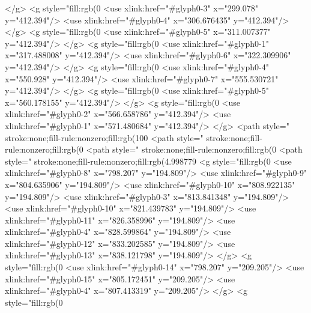 </g>
<g style="fill:rgb(0%
  <use xlink:href="#glyph0-3" x="299.078" y="412.394"/>
  <use xlink:href="#glyph0-4" x="306.676435" y="412.394"/>
</g>
<g style="fill:rgb(0%
  <use xlink:href="#glyph0-5" x="311.007377" y="412.394"/>
</g>
<g style="fill:rgb(0%
  <use xlink:href="#glyph0-1" x="317.488008" y="412.394"/>
  <use xlink:href="#glyph0-6" x="322.309906" y="412.394"/>
</g>
<g style="fill:rgb(0%
  <use xlink:href="#glyph0-4" x="550.928" y="412.394"/>
  <use xlink:href="#glyph0-7" x="555.530721" y="412.394"/>
</g>
<g style="fill:rgb(0%
  <use xlink:href="#glyph0-5" x="560.178155" y="412.394"/>
</g>
<g style="fill:rgb(0%
  <use xlink:href="#glyph0-2" x="566.658786" y="412.394"/>
  <use xlink:href="#glyph0-1" x="571.480684" y="412.394"/>
</g>
<path style=" stroke:none;fill-rule:nonzero;fill:rgb(100%
<path style=" stroke:none;fill-rule:nonzero;fill:rgb(0%
<path style=" stroke:none;fill-rule:nonzero;fill:rgb(0%
<path style=" stroke:none;fill-rule:nonzero;fill:rgb(4.998779%
<g style="fill:rgb(0%
  <use xlink:href="#glyph0-8" x="798.207" y="194.809"/>
  <use xlink:href="#glyph0-9" x="804.635906" y="194.809"/>
  <use xlink:href="#glyph0-10" x="808.922135" y="194.809"/>
  <use xlink:href="#glyph0-3" x="813.841348" y="194.809"/>
  <use xlink:href="#glyph0-10" x="821.439783" y="194.809"/>
  <use xlink:href="#glyph0-11" x="826.358996" y="194.809"/>
  <use xlink:href="#glyph0-4" x="828.599864" y="194.809"/>
  <use xlink:href="#glyph0-12" x="833.202585" y="194.809"/>
  <use xlink:href="#glyph0-13" x="838.121798" y="194.809"/>
</g>
<g style="fill:rgb(0%
  <use xlink:href="#glyph0-14" x="798.207" y="209.205"/>
  <use xlink:href="#glyph0-15" x="805.172451" y="209.205"/>
  <use xlink:href="#glyph0-4" x="807.413319" y="209.205"/>
</g>
<g style="fill:rgb(0%
